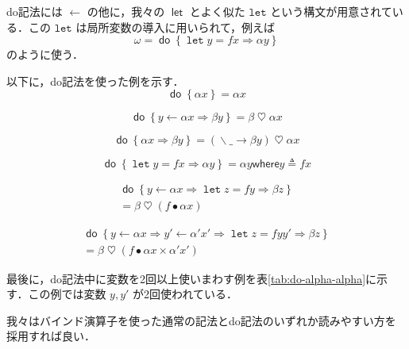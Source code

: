 \documentclass[a4paper,twocolumn]{jsbook}
\def\({\left(\!\left(}
\def\){\right)\!\right)}
\newcommand{\mKeyword}[1]{\mathsf{#1}} %
\newcommand{\mVarKeyword}[1]{\texttt{#1}}
\newcommand{\mDoKeyword}{\mKeyword{do}}
\newcommand{\mDoLetKeyword}{\mVarKeyword{let}}
\newcommand{\mLetKeyword}{\mKeyword{let}}
\newcommand{\mWhereKeyword}{\mKeyword{where}}
\DeclareMathOperator{\mDoKW}{\mDoKeyword}
\DeclareMathOperator{\mLet}{\mLetKeyword} %
\newcommand{\mAnyParam}{\_}
\DeclareMathOperator{\mAppMap}{\times}
\DeclareMathOperator{\mBind}{\heartsuit}
\DeclareMathOperator{\mDoEq}{\leftarrow}
\DeclareMathOperator{\mDoLetEq}{\mVarKeyword{=}}
\DeclareMathOperator{\mDoNext}{\Rightarrow}%
\DeclareMathOperator{\mLambda}{\backslash}
\DeclareMathOperator{\mLambdaArrow}{\rightarrow}
\DeclareMathOperator{\mLetEq}{\triangleq}
\DeclareMathOperator{\mMap}{\bullet}
\newcommand{\mFuncWith}[1]{\(#1\)}
\newcommand{\mDo}[1]{\mDoKW\left\{#1\right\}}
\newcommand{\mDoLet}[2]{\mathop{\mDoLetKeyword}#1\mDoLetEq#2}
\newcommand{\mLambdaExp}[2]{\mLambda{#1}\mLambdaArrow{#2}}
\newcommand{\mWhere}[2]{\mathbin{\mWhereKeyword}#1\mLetEq#2}
\begin{document}
do記法には $\mDoEq$ の他に，我々の $\mLet$ とよく似た $\mDoLetKeyword$ という構文が用意されている．この $\mDoLetKeyword$ は局所変数の導入に用いられて，例えば
\begin{equation}
\omega=\mDo{\mDoLet{y}{fx}\mDoNext\alpha y}
\end{equation}
のように使う．

以下に，do記法を使った例を示す．
\begin{equation}
\mDo{\alpha x}=\alpha x
\end{equation}

\begin{equation}
\mDo{y\mDoEq\alpha x\mDoNext\beta y}=\beta\mBind\alpha x
\end{equation}

\begin{equation}
\mDo{\alpha x\mDoNext\beta y}=(\mLambdaExp{\mAnyParam}{\beta y})\mBind \alpha x\label{eq:do-alpha-beta}
\end{equation}

\begin{equation}
\mDo{\mDoLet{y}{fx}\mDoNext\alpha y}=\alpha y\mWhere{y}{fx}
\end{equation}

\begin{multline}
\mDo{y\mDoEq\alpha x\mDoNext\mDoLet{z}{fy}\mDoNext\beta z}\\
=\beta\mBind{}(f\mMap\alpha x)
\end{multline}

\begin{multline}
\mDo{y\mDoEq\alpha x\mDoNext y'\mDoEq\alpha'x'\mDoNext\mDoLet{z}{fyy'}\mDoNext\beta z}\\
=\beta\mBind{}(f\mMap\alpha x\mAppMap\alpha'x')
\end{multline}



最後に，do記法中に変数を2回以上使いまわす例を表\ref{tab:do-alpha-alpha}に示す．この例では変数 $y,y'$ が2回使われている．

我々はバインド演算子を使った通常の記法とdo記法のいずれか読みやすい方を採用すれば良い．


\end{document}
